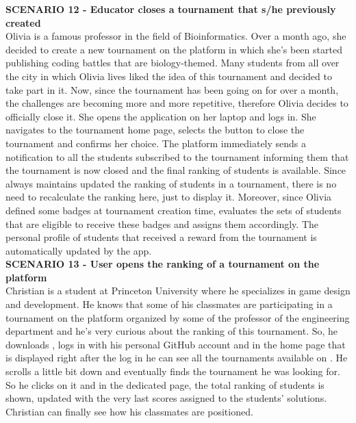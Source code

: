	\textbf{SCENARIO 12 - Educator closes a tournament that s/he previously created}\\
    Olivia is a famous professor in the field of Bioinformatics. Over a month ago, she decided to create a new tournament on the \app platform in which she's been started publishing coding battles that are biology-themed. Many students from all over the city in which Olivia lives liked the idea of this tournament and decided to take part in it. Now, since the tournament has been going on for over a month, the challenges are becoming more and more repetitive, therefore Olivia decides to officially close it. She opens the \app application on her laptop and logs in. She navigates to the tournament home page, selects the button to close the tournament and confirms her choice. The \app platform immediately sends a notification to all the students subscribed to the tournament informing them that the tournament is now closed and the final ranking of students is available. Since \app always maintains updated the ranking of students in a tournament, there is no need to recalculate the ranking here, just to display it. Moreover, since Olivia defined some badges at tournament creation time, \app evaluates the sets of students that are eligible to receive these badges and assigns them accordingly. The personal profile of students that received a reward from the tournament is automatically updated by the app.\\

    \textbf{SCENARIO 13 - User opens the ranking of a tournament on the \app platform}\\
    Christian is a student at Princeton University where he specializes in game design and development. He knows that some of his classmates are participating in a tournament on the \app platform organized by some of the professor of the engineering department and he's very curious about the ranking of this tournament. So, he downloads \app, logs in with his personal GitHub account and in the home page that is displayed right after the log in he can see all the tournaments available on \app. He scrolls a little bit down and eventually finds the tournament he was looking for. So he clicks on it and in the dedicated page, the total ranking of students is shown, updated with the very last scores assigned to the students' solutions. Christian can finally see how his classmates are positioned.\\

